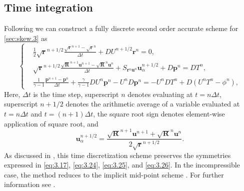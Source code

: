 \subsection{Time integration}
Following \cite{reiss2014conservative,morinishi2010skew} we can construct a fully discrete second order accurate scheme for \eqref{sec:skew.3} as
\begin{equation} \label{eq:3.27}
	\left\{
	\begin{aligned}
	&\frac 1 2 \sqrt{\mathbf r} ^{n+1/2} \frac{\sqrt{\mathbf r}^{n+1} - \sqrt{\mathbf r}^{n}}{\Delta t} + DU^{n+1/2} \mathbf r^{n} = 0, \\
	& \sqrt{\mathbf r} ^{n+1/2}  \frac{\sqrt{ \mathbf R}^{n+1} \mathbf u^{n+1} - \sqrt{\mathbf R}^{n}\mathbf u^n}{\Delta t} + S_{\mathbf r^{n} \mathbf u^n} \mathbf u^{n+1/2}_\alpha + D \mathbf p^{n} = DT^{n}, \\
	& \frac 1 {\gamma -1} \frac{\mathbf p^{n+1} - \mathbf p^n}{\Delta t} + \frac{\gamma}{\gamma -1} D U^{n} \mathbf p^n - U^{n} D \mathbf p^n = - U^{n}D T^{n} + D (U^nT^n - \phi^n),
	\end{aligned}
	\right.
\end{equation}
 Here,  $\Delta t$ is the time step, superscript $n$ denotes evaluating at $t = n\Delta t$, superscript $n+1/2$ denotes the arithmetic average of a variable evaluated at $t=n\Delta t$ and $t=(n+1)\Delta t$, the square root sign denotes element-wise application of square root, and 
\begin{equation}
	\mathbf u_{\alpha}^{n+1/2} = \frac{\sqrt{\mathbf R}^{n+1} \mathbf u^{n+1} + \sqrt{\mathbf R}^{n} \mathbf u^{n}}{2\sqrt{\mathbf r}^{n+1/2} }.
\end{equation}
As discussed in \cite{reiss2014conservative}, this time discretization scheme preserves the symmetries expressed in \eqref{eq:3.17}, \eqref{eq:3.24}, \eqref{eq:3.25}, and \eqref{eq:3.26}. In the incompressible case, the method reduces to the implicit mid-point scheme \cite{hairer2006geometric}. For further information see \cite{reiss2014conservative,morinishi2010skew}.
